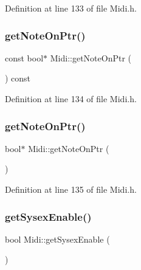 Definition at line 133 of file Midi.\+h.

\mbox{\label{class_midi_a24bd886dbe0a2ab6c9b3c0739f613f2b}} 
\subsubsection{\texorpdfstring{get\+Note\+On\+Ptr()}{getNoteOnPtr()}\hspace{0.1cm}{\footnotesize\ttfamily [1/2]}}
{\footnotesize\ttfamily const bool$\ast$ Midi\+::get\+Note\+On\+Ptr (\begin{DoxyParamCaption}{ }\end{DoxyParamCaption}) const\hspace{0.3cm}{\ttfamily [inline]}}



Definition at line 134 of file Midi.\+h.

\mbox{\label{class_midi_ac45251220870ecd342ececc1e3a87f18}} 
\subsubsection{\texorpdfstring{get\+Note\+On\+Ptr()}{getNoteOnPtr()}\hspace{0.1cm}{\footnotesize\ttfamily [2/2]}}
{\footnotesize\ttfamily bool$\ast$ Midi\+::get\+Note\+On\+Ptr (\begin{DoxyParamCaption}{ }\end{DoxyParamCaption})\hspace{0.3cm}{\ttfamily [inline]}}



Definition at line 135 of file Midi.\+h.

\mbox{\label{class_midi_ad62ae6ae2d3ca5b4d35afa62b1a8c4c8}} 
\subsubsection{\texorpdfstring{get\+Sysex\+Enable()}{getSysexEnable()}}
{\footnotesize\ttfamily bool Midi\+::get\+Sysex\+Enable (\begin{DoxyParamCaption}{ }\end{DoxyParamCaption})\hspace{0.3cm}{\ttfamily [inline]}}



